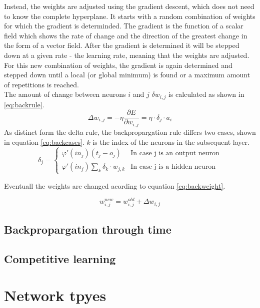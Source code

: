 \documentclass[10pt,a4paper,DIV=11]{scrreprt}
\begin{document}
Instead, the weights are adjusted using the gradient descent, which does not need to know the complete hyperplane. It starts with a random combination of weights for which the gradient is determinded. The gradient is the function of a scalar field which shows the rate of change and the direction of the greatest change in the form of a vector field. After the gradient is determined it will be stepped down at a given rate - the learning rate, meaning that the weights are adjusted. For this new combination of weights, the gradient is again determined and stepped down until a local (or global minimum) is found or a maximum amount of repetitions is reached.\\

The amount of change between neurons $i$ and $j$ $\delta w_{i,j}$ is calculated as shown in \eqref{eq:backrule}.
\begin{equation}
\Delta w_{i,j} = -\eta \frac{\partial E}{\partial w_{i,j}} = \eta \cdot \delta_j \cdot a_i
\label{eq:backrule}
\end{equation}
As distinct form the delta rule, the backpropargation rule differs two cases, shown in equation \eqref{eq:backcases}. $k$ is the index of the neurons in the subsequent layer.
\begin{equation}
   \delta_j =
   \begin{cases}
     \varphi'(in_j)(t_j-o_j) & \text{In case j is an output neuron} \\
     \varphi'(in_j)\sum_{k} \delta_k \cdot w_{j,k} & \text{In case j is a hidden neuron}
   \end{cases}
\label{eq:backcases}
\end{equation}

Eventuall the weights are changed acording to equation \eqref{eq:backweight}.

\begin{equation}
   w_{i,j}^{new} = w_{i,j}^{old} + \Delta w_{i,j}
\label{eq:backweight}
\end{equation}

\subsection{Backpropargation through time}
\subsection{Competitive learning}
\section{Network tpyes}
\end{document}
